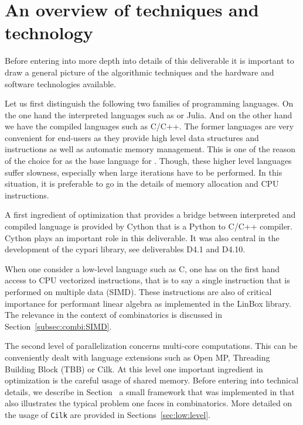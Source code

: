 \documentclass{deliverablereport}
\newcommand{\Cilk}{\texttt{Cilk}\xspace}
\begin{document}

\section{An overview of techniques and technology}

Before entering into more depth into details of this deliverable it is
important to draw a general picture of the algorithmic techniques
and the hardware and software technologies available.

Let us first distinguish the following two families of programming
languages. On the one hand the interpreted languages
such as \Python or Julia. And on the other hand we have the compiled languages
such as C/C++. The former languages are very convenient for end-users as
they provide high level data structures and instructions as well as automatic
memory management. This is one of the reason of the choice for \Python as the
base language for \Sage. Though, these higher level languages suffer slowness,
especially when large iterations have to be performed. In this situation, it is
preferable to go in the details of memory allocation and CPU instructions.

A first ingredient of optimization that provides a bridge between interpreted
and compiled language is provided by Cython that is a Python
to C/C++ compiler. Cython plays an important role in this deliverable. It
was also central in the development of the cypari library, see deliverables
D4.1 and D4.10.

When one consider a low-level language such as C, one has on the first hand
access to CPU vectorized instructions, that is to say a single instruction that
is performed on multiple data (SIMD). These
instructions are also of critical importance for performant linear
algebra as implemented in the LinBox library. The relevance in the context
of combinatorics is discussed in Section~\ref{subsec:combi:SIMD}.

The second level of parallelization concerns multi-core computations. This can
be conveniently dealt with language extensions such as Open MP,
Threading Building Block (TBB) or Cilk. At this level one important
ingredient in optimization is the careful usage of shared memory.
Before entering into technical details, we describe in
Section~\label{subsec:map-reduce:Sage} a small framework that was
implemented in \Sage that also illustrates the typical problem one faces
in combinatorics. More detailed on the usage of \Cilk are provided
in Sections~\ref{sec:low:level}.
\end{document}

